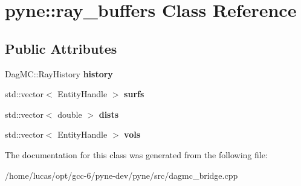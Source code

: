 \hypertarget{classpyne_1_1ray__buffers}{}\section{pyne\+:\+:ray\+\_\+buffers Class Reference}
\label{classpyne_1_1ray__buffers}
\subsection*{Public Attributes}
\begin{DoxyCompactItemize}
\item 
Dag\+M\+C\+::\+Ray\+History {\bfseries history}\hypertarget{classpyne_1_1ray__buffers_adb3331dbf290b1c6d44c37931a917a7e}{}\label{classpyne_1_1ray__buffers_adb3331dbf290b1c6d44c37931a917a7e}

\item 
std\+::vector$<$ Entity\+Handle $>$ {\bfseries surfs}\hypertarget{classpyne_1_1ray__buffers_ac2a784c86703f7253861ceaa73ba5e6b}{}\label{classpyne_1_1ray__buffers_ac2a784c86703f7253861ceaa73ba5e6b}

\item 
std\+::vector$<$ double $>$ {\bfseries dists}\hypertarget{classpyne_1_1ray__buffers_a2904cd95dd5c1cb04ca796cf025bced1}{}\label{classpyne_1_1ray__buffers_a2904cd95dd5c1cb04ca796cf025bced1}

\item 
std\+::vector$<$ Entity\+Handle $>$ {\bfseries vols}\hypertarget{classpyne_1_1ray__buffers_a2d059fcf9432e03b28eade60308b2498}{}\label{classpyne_1_1ray__buffers_a2d059fcf9432e03b28eade60308b2498}

\end{DoxyCompactItemize}


The documentation for this class was generated from the following file\+:\begin{DoxyCompactItemize}
\item 
/home/lucas/opt/gcc-\/6/pyne-\/dev/pyne/src/dagmc\+\_\+bridge.\+cpp\end{DoxyCompactItemize}
